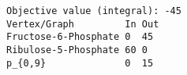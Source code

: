 \begin{verbatim}
Objective value (integral): -45
Vertex/Graph         In Out 
Fructose-6-Phosphate 0  45  
Ribulose-5-Phosphate 60 0   
p_{0,9}              0  15  
\end{verbatim}

